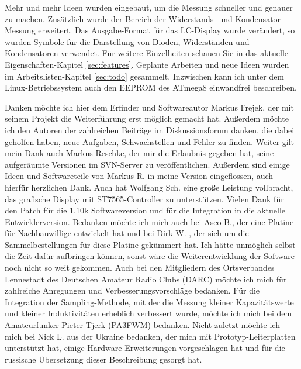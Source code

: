 Mehr und mehr Ideen wurden eingebaut, um die Messung schneller und genauer zu machen.
Zusätzlich wurde der Bereich der Widerstands- und Kondensator-Messung erweitert.
Das Ausgabe-Format für das LC-Display wurde verändert, so wurden Symbole für die Darstellung von
Dioden, Widerständen und Kondensatoren verwendet.
Für weitere Einzelheiten schauen Sie in das aktuelle Eigenschaften-Kapitel \ref{sec:features}.
Geplante Arbeiten und neue Ideen wurden im Arbeitslisten-Kapitel \ref{sec:todo} gesammelt.
Inzwischen kann ich unter dem Linux-Betriebssystem auch den EEPROM des ATmega8 einwandfrei beschreiben.

Danken möchte ich hier dem Erfinder und Softwareautor Markus Frejek, der mit seinem Projekt die Weiterführung erst
möglich gemacht hat.
Außerdem möchte ich den Autoren der zahlreichen Beiträge im Diskussionsforum danken, die dabei geholfen haben, neue Aufgaben, Schwachstellen und
Fehler zu finden. 
Weiter gilt mein Dank auch Markus Reschke, der mir die Erlaubnis gegeben hat, seine aufgeräumte Versionen im
SVN-Server zu veröffentlichen. Außerdem sind einige Ideen und Softwareteile von Markus R. in meine Version eingeflossen,
auch hierfür herzlichen Dank.
Auch hat Wolfgang Sch. eine große Leistung vollbracht, das grafische Display mit ST7565-Controller zu unterstützen.
Vielen Dank für den Patch für die 1.10k Softwareversion und für die Integration in die aktuelle Entwicklerversion.
Bedanken möchte ich mich auch bei Asco B., der eine Platine für Nachbauwillige entwickelt hat und bei Dirk W. , der sich
um die Sammelbestellungen für diese Platine gekümmert hat. Ich hätte unmöglich selbst die Zeit dafür aufbringen können, sonst
wäre die Weiterentwicklung der Software noch nicht so weit gekommen.
Auch bei den Mitgliedern des Ortsverbandes Lennestadt des Deutschen Amateur Radio Clubs (DARC) möchte ich mich für zahlreiche
Anregungen und Verbesserungsvorschläge bedanken.
Für die Integration der Sampling-Methode, mit der die Messung kleiner Kapazitätswerte und kleiner Induktivitäten
erheblich verbessert wurde, möchte ich mich bei dem Amateurfunker Pieter-Tjerk (PA3FWM) bedanken.
Nicht zuletzt möchte ich mich bei Nick L. aus der Ukraine bedanken, der mich mit Prototyp-Leiterplatten unterstützt hat,
einige Hardware-Erweiterungen vorgeschlagen hat und für die russische Übersetzung dieser Beschreibung gesorgt hat.

